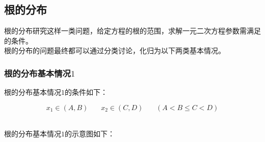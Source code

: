 \documentclass[UTF8]{ctexart}
\begin{document}
\newpage

\subsection{根的分布}
    根的分布研究这样一类问题，给定方程的根的范围，求解一元二次方程参数需满足的条件。\\[3mm]
    根的分布的问题最终都可以通过分类讨论，化归为以下两类基本情况。

\subsubsection{根的分布基本情况$1$}
    根的分布基本情况$1$的条件如下：
    \begin{large}
        \begin{equation*}
            x_1\in(A,B)~~~~~~~~x_2\in(C,D)~~~~~~~~(A<B\leq C<D)
        \end{equation*}
    \end{large}\\
    根的分布基本情况$1$的示意图如下：\vspace{5pt}
\end{document}
